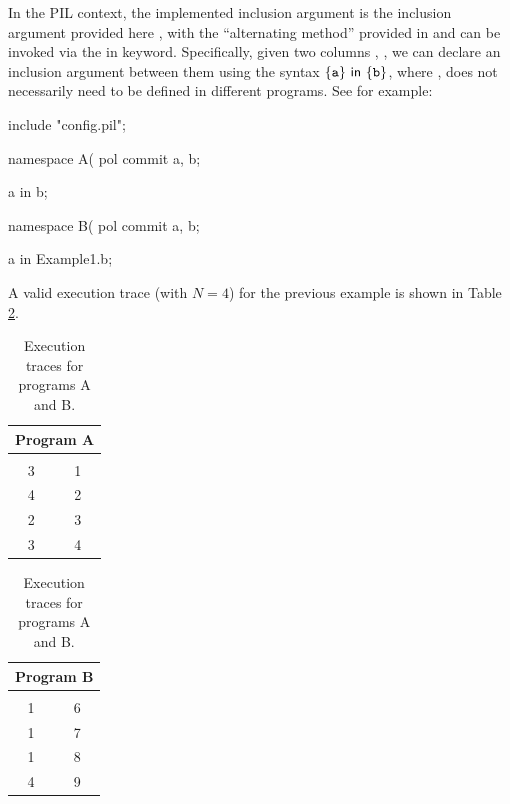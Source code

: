 
In the PIL context, the implemented inclusion argument is the inclusion argument provided here \cite{EPRINT:GabWil20}, with the ``alternating method''  provided in \cite{EPRINT:PFMBM22} and can be invoked via the \textsf{in} keyword. Specifically, given two columns \att, \btt, we can declare an inclusion argument between them using the syntax $\{\mathtt{a}\} \textsf{ in } \{\mathtt{b}\}$, where \att, \btt does not necessarily need to be defined in different programs. See for example:
\begin{pil}
    include "config.pil";
    
    namespace A(%
    pol commit a, b;
    
    {a} in {b};
    
    namespace B(%
    pol commit a, b;
    
    {a} in {Example1.b};
\end{pil}
A valid execution trace (with $N=4$) for the previous example is shown in Table \ref{table:is-example-1}.
\begin{table}[H]
    \centering
    \begin{tabular}{|c|c|}
        \hline
        \multicolumn{2}{|c|}{\textbf{Program A}} \\
        \hline
        \att	&\btt	\\ \hline
        3	&1	\\
        4	&2 \\
        2	&3\\
        3	&4 \\
        \hline
    \end{tabular}
    \begin{tabular}{|c|c|}
        \hline
        \multicolumn{2}{|c|}{\textbf{Program B}} \\
        \hline
        \att	&\btt	\\ \hline
        1	&6 \\
        1	&7 \\
        1	&8 \\
        4	&9 \\
        \hline
    \end{tabular}
    \caption{Execution traces for programs \textsf{A} and \textsf{B}. }
    \label{table:is-example-1}
\end{table}


